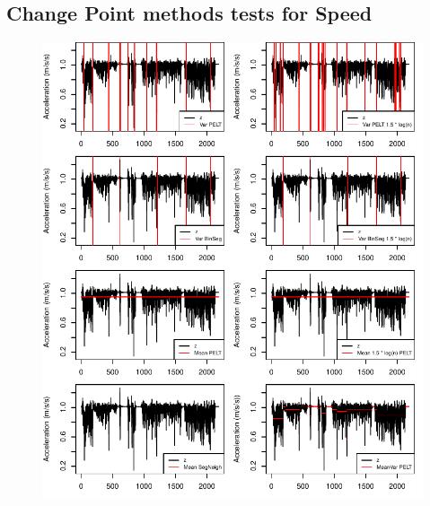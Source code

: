 \begin{appendix}
\section{Change Point methods tests for Speed}\label{Acptest}
\begin{figure}
\includegraphics{img/R_comparisonMethodsZax.pdf}
\end{figure}




\end{appendix}